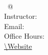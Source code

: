 \documentclass[12pt,twoside]{article}
\begin{document}
%

\begin{flushleft}
\textbf{\CourseTitle{}} \\
\DateTimeone \ @ \Roomone \\
Instructor: \InstructorName \\
Email: \Email \\
Office Hours: \OfficeHours \\
\url{\Website} \\
\end{flushleft}






\nocite{*}


\vfill
\footnotesize

\end{document}

